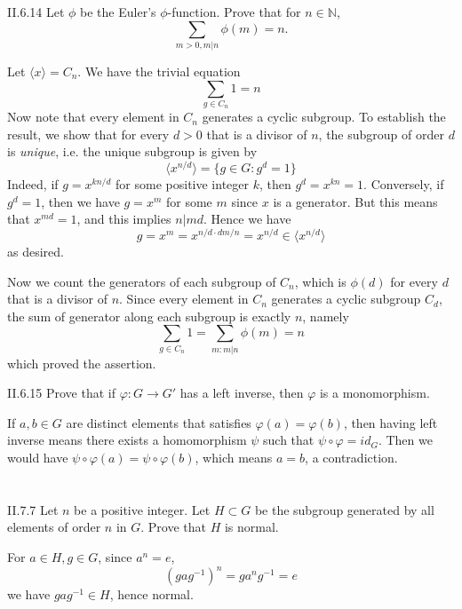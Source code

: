 \begin{problem}{II.6.14}
Let $\phi$ be the Euler's $\phi$-function. Prove that for $n \in \mathbb{N}$, 
\[
\sum_{m>0, m|n} \phi(m) = n.
\]
\end{problem}
\begin{pf}
Let $\langle x \rangle = C_n$. We have the trivial equation 
\[
\sum_{g \in C_n} 1 = n
\]
Now note that every element in $C_n$ generates a cyclic subgroup. To establish the result, we show that for every $d > 0$ that is a divisor of $n$, the subgroup of order $d$ is \emph{unique}, i.e. the unique subgroup is given by
\[
\langle x^{n/d} \rangle = \{g \in G : g^d = 1\}
\]
Indeed, if $g = x^{kn/d}$ for some positive integer $k$, then $g^d = x^{kn} = 1$. Conversely, if $g^d = 1$, then we have $g = x^m$ for some $m$ since $x$ is a generator. But this means that $x^{md} = 1$, and this implies $n|md$. Hence we have
\[
g = x^{m} = x^{n/d \cdot dm/n} = x^{n/d} \in \langle x^{n/d} \rangle
\]
as desired.

Now we count the generators of each subgroup of $C_n$, which is $\phi(d)$ for every $d$ that is a divisor of $n$. Since every element in $C_n$ generates a  cyclic subgroup $C_d$, the sum of generator along each subgroup is exactly $n$, namely
\[
\sum_{g \in C_n} 1 = \sum_{m : m|n} \phi(m) = n
\]
which proved the assertion.
\end{pf}

\begin{problem}{II.6.15}
Prove that if $\varphi:G \to G'$ has a left inverse, then $\varphi$ is a monomorphism.
\end{problem}
\begin{pf}
If $a, b \in G$ are distinct elements that satisfies $\varphi(a) = \varphi(b)$, then having left inverse means there exists a homomorphism $\psi$ such that $\psi \circ \varphi = id_G$. Then we would have $\psi \circ \varphi(a) = \psi \circ \varphi(b)$, which means $a = b$, a contradiction.
\end{pf}

\section{}

\begin{problem}{II.7.7}
Let $n$ be a positive integer. Let $H \subset G$ be the subgroup generated by all elements of order $n$ in $G$. Prove that $H$ is normal.
\end{problem}
\begin{pf}
For $a \in H, g \in G$, since $a^n = e$,
\[
(gag^{-1})^n = ga^ng^{-1} = e
\]
we have $gag^{-1} \in H$, hence normal.
\end{pf}

